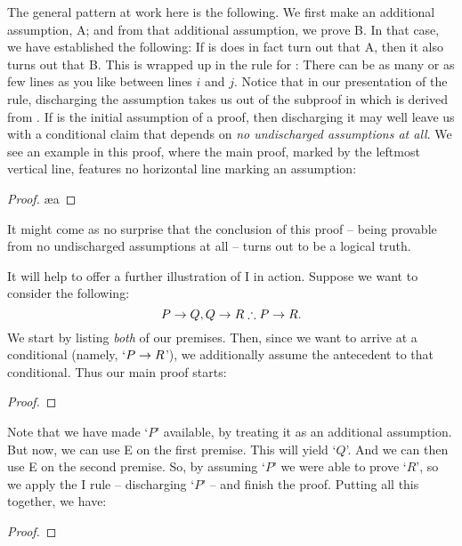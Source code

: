The general pattern at work here is the following. We first make an additional assumption, A; and from that additional assumption, we prove B. In that case, we have established the following: If is does in fact turn out that A, then it also turns out that B. This is wrapped up in the rule for :
There can be as many or as few lines as you like between lines $i$ and $j$. Notice that in our presentation of the rule, discharging the assumption  takes us out of the subproof in which  is derived from . If  is the initial assumption of a proof, then discharging it may well leave us with a conditional claim that depends on \emph{no undischarged assumptions at all}. We see an example in this proof, where the main proof, marked by the leftmost vertical line, features no horizontal line marking an assumption:
\begin{proof}
	\open {}
	\ae{a}
	\close
\end{proof} It might come as no surprise that the conclusion of this proof – being provable from no undischarged assumptions at all – turns out to be a logical truth. 


It will help to offer a further  illustration of {\eif}I in action. Suppose we want to consider the following:
	$$P \rightarrow Q, Q \rightarrow R \mathrel{\therefore} P \rightarrow R.$$
We start by listing \emph{both} of our premises. Then, since we want to arrive at a conditional (namely, `$P \rightarrow R$'), we additionally assume the antecedent to that conditional. Thus our main proof starts:
\begin{proof}
	\open
	\close
\end{proof}
Note that we have made `$P$' available, by treating it as an additional assumption. But now, we can use {\eif}E on the first premise. This will yield `$Q$'. And we can then use {\eif}E on the second premise. So, by assuming `$P$' we were able to prove `$R$', so we apply the {\eif}I rule – discharging `$P$' – and finish the proof. Putting all this together, we have:
\label{HSproof}
\begin{proof}
	\open
	\close
\end{proof}

